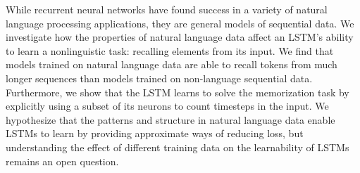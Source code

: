 While recurrent neural networks have found success in a variety of natural language processing applications, they are general models of sequential data. We investigate how the properties of natural language data affect an LSTM's ability to learn a nonlinguistic task: recalling elements from its input. We find that models trained on natural language data are able to recall tokens from much longer sequences than models trained  on non-language sequential data. Furthermore, we show that the LSTM learns to solve the memorization task by explicitly using a subset of its neurons to count timesteps in the input. We hypothesize that the patterns and structure in natural language data enable LSTMs to learn by providing approximate ways of reducing loss, but understanding the effect of different training data on the learnability of LSTMs remains an open question.
